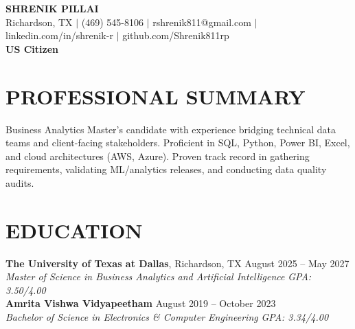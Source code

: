 \documentclass[11pt,letterpaper]{article}
\begin{document}
\begin{center}
{\LARGE \textbf{SHRENIK PILLAI}} \\ \vspace{2pt}
\small Richardson, TX $|$ (469) 545-8106 $|$ rshrenik811@gmail.com $|$ linkedin.com/in/shrenik-r $|$ github.com/Shrenik811rp \\ \vspace{1pt}
\small \textbf{US Citizen}
\end{center}
\section*{PROFESSIONAL SUMMARY}
\noindent\small Business Analytics Master's candidate with experience bridging technical data teams and client-facing stakeholders. Proficient in SQL, Python, Power BI, Excel, and cloud architectures (AWS, Azure). Proven track record in gathering requirements, validating ML/analytics releases, and conducting data quality audits.
\section*{EDUCATION}
\noindent\small \textbf{The University of Texas at Dallas}, Richardson, TX \hfill August 2025 -- May 2027 \\
\textit{Master of Science in Business Analytics and Artificial Intelligence} \hfill \textit{GPA: 3.50/4.00} \\
\noindent\small \textbf{Amrita Vishwa Vidyapeetham} \hfill August 2019 -- October 2023 \\
\textit{Bachelor of Science in Electronics \& Computer Engineering} \hfill \textit{GPA: 3.34/4.00}
\end{document}
